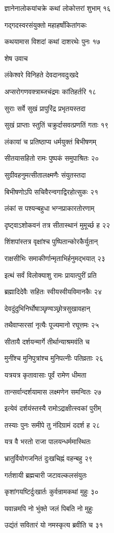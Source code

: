 ज्ञानेनालोकयांचक्रे कथां लोकोत्तरां शुभाम् १६

गद्गदस्वरसंयुक्तो महाहर्षांकितांगकः

कथयामास विशदां कथां दाशरथेः पुनः १७

शेष उवाच

लंकेश्वरे विनिहते देवदानवदुःखदे

अप्सरोगणवक्त्राब्जचंद्रमः कांतिहर्तरि १८

सुराः सर्वे सुखं प्रापुरिंद्र प्रभृतयस्तदा

सुखं प्राप्ताः स्तुतिं चक्रुर्दासवत्प्रणतिं गताः १९

लंकायां च प्रतिष्ठाप्य धर्मयुक्तं बिभीषणम्

सीतयासहितो रामः पुष्पकं समुपाश्रितः २०

सुग्रीवहनुमत्सीतालक्ष्मणैः संयुतस्तदा

बिभीषणोऽपि सचिवैरन्वगाद्विरहोत्सुकः २१

लंकां स पश्यन्बहुधा भग्नप्राकारतोरणाम्

दृष्ट्वाऽशोकवनं तत्र सीतास्थानं मुमूर्च्छ ह २२

शिंशपांस्तत्र वृक्षांश्च पुष्पितान्कोरकैर्युतान्

राक्षसीभिः समाकीर्णान्मृताभिर्हनुमद्भयात् २३

इत्थं सर्वं विलोक्याशु रामः प्रायात्पुरीं प्रति

ब्रह्मादिदेवैः सहितः स्वीयस्वीयविमानकैः २४

देवदुंदुभिनिर्घोषाञ्छृण्वञ्छ्रोत्रसुखावहान्

तथैवाप्सरसां नृत्यैः पूज्यमानो रघूत्तमः २५

सीतायै दर्शयन्मार्गे तीर्थान्याश्रमवंति च

मुनींश्च मुनिपुत्रांश्च मुनिपत्नीः पतिव्रताः २६

यत्रयत्र कृतावासाः पूर्वं रामेण धीमता

तान्सर्वान्दर्शयामास लक्ष्मणेन समन्वितः २७

इत्येवं दर्शयंस्तस्यै रामोऽद्राक्षीत्स्वकां पुरीम्

तस्याः पुनः समीपे तु नंदिग्रामं ददर्श ह २८

यत्र वै भरतो राजा पालयन्धर्ममास्थितः

भ्रातुर्वियोगजनितं दुःखचिह्नं वहन्बहु २९

गर्तशायी ब्रह्मचारी जटावल्कलसंयुतः

कृशांगयष्टिर्दुःखार्तः कुर्वन्रामकथां मुहुः ३०

यवान्नमपि नो भुंक्ते जलं पिबति नो मुहुः

उद्यंतं सवितारं यो नमस्कृत्य ब्रवीति च ३१

